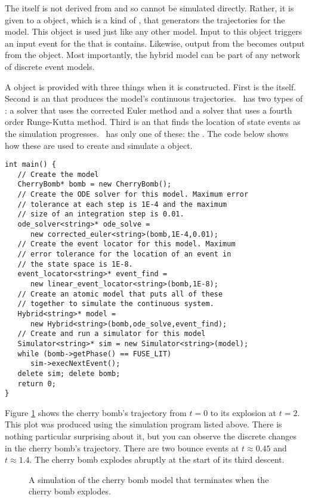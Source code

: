 The  itself is not derived from  and so cannot be simulated directly. Rather, it is given to a  object, which is a kind of , that generators the trajectories for the model. This  object is used just like any other  model. Input to this  object triggers an input event for the  that is contains. Likewise, output from the  becomes output from the  object. Most importantly, the hybrid model can be part of any network of discrete event models.

A  object is provided with three things when it is constructed. First is the  itself. Second is an  that produces the model's continuous trajectories. \adevs\ has two types of : a  solver that uses the corrected Euler method and a  solver that uses a fourth order Runge-Kutta method. Third is an  that finds the location of state events as the simulation progresses. \adevs\ has only one of these: the . The code below shows how these are used to create and simulate a  object.
\begin{verbatim}
int main() {
   // Create the model
   CherryBomb* bomb = new CherryBomb();
   // Create the ODE solver for this model. Maximum error
   // tolerance at each step is 1E-4 and the maximum
   // size of an integration step is 0.01.
   ode_solver<string>* ode_solve =
      new corrected_euler<string>(bomb,1E-4,0.01);
   // Create the event locator for this model. Maximum
   // error tolerance for the location of an event in
   // the state space is 1E-8.
   event_locator<string>* event_find =
      new linear_event_locator<string>(bomb,1E-8);
   // Create an atomic model that puts all of these
   // together to simulate the continuous system.
   Hybrid<string>* model =
      new Hybrid<string>(bomb,ode_solve,event_find);
   // Create and run a simulator for this model
   Simulator<string>* sim = new Simulator<string>(model);
   while (bomb->getPhase() == FUSE_LIT)
      sim->execNextEvent();
   delete sim; delete bomb;
   return 0;
}

\end{verbatim}

Figure \ref{fig:cherry_bomb_trajectory} shows the cherry bomb's trajectory from $t=0$ to its explosion at $t=2$. This plot was produced using the simulation program listed above. There is nothing particular surprising about it, but you can observe the discrete changes in the cherry bomb's trajectory. There are two bounce events at $t \approx 0.45$ and $t \approx 1.4$. The cherry bomb explodes abruptly at the start of its third descent.
\begin{figure}[ht]
\centering
{}
\caption{A simulation of the cherry bomb model that terminates when the cherry bomb explodes.}
\label{fig:cherry_bomb_trajectory}
\end{figure}

